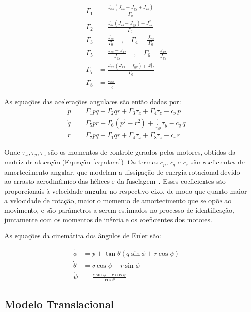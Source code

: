 \documentclass{ieeeaccess}
\begin{document}
\begin{align}
\Gamma_1 &= \frac{J_{xz}(J_{xx} - J_{yy} + J_{zz})}{\Gamma_0} \\
\Gamma_2 &= \frac{J_{zz}(J_{zz} - J_{yy}) + J_{xz}^2}{\Gamma_0} \\
\Gamma_3 &= \frac{J_{zz}}{\Gamma_0} \quad , \quad
\Gamma_4 = \frac{J_{xz}}{\Gamma_0} \\
\Gamma_5 &= \frac{J_{zz} - J_{xx}}{J_{yy}} \quad , \quad
\Gamma_6 = \frac{J_{xz}}{J_{yy}} \\
\Gamma_7 &= \frac{J_{xx}(J_{xx} - J_{yy}) + J_{xz}^2}{\Gamma_0} \\
\Gamma_8 &= \frac{J_{xx}}{\Gamma_0}
\end{align}

As equações das acelerações angulares são então dadas por:
\begin{align}
\dot{p} &= \Gamma_1 pq - \Gamma_2 qr + \Gamma_3 \tau_x + \Gamma_4 \tau_z - c_p\, p \\
\dot{q} &= \Gamma_5 pr - \Gamma_6 (p^2 - r^2) + \frac{1}{J_{yy}}\tau_y - c_q\, q \\
\dot{r} &= \Gamma_7 pq - \Gamma_1 qr + \Gamma_4 \tau_x + \Gamma_8 \tau_z - c_r\, r
\end{align}

Onde $\tau_x, \tau_y, \tau_z$ são os momentos de controle gerados pelos motores, obtidos da matriz de alocação (Equação~\eqref{eq:aloca}). Os termos $c_p$, $c_q$ e $c_r$ são coeficientes de amortecimento angular, que modelam a dissipação de energia rotacional devido ao arrasto aerodinâmico das hélices e da fuselagem~\cite{c13}. Esses coeficientes são proporcionais à velocidade angular no respectivo eixo, de modo que quanto maior a velocidade de rotação, maior o momento de amortecimento que se opõe ao movimento, e são parâmetros a serem estimados no processo de identificação, juntamente com os momentos de inércia e os coeficientes dos motores.

As equações da cinemática dos ângulos de Euler são:

\begin{align}
\dot{\phi} &= p + \tan\theta(q\sin\phi + r\cos\phi) \\
\dot{\theta} &= q\cos\phi - r\sin\phi \\
\dot{\psi} &= \frac{q\sin\phi + r\cos\phi}{\cos\theta}
\end{align}

\subsection{Modelo Translacional}
\end{document}
